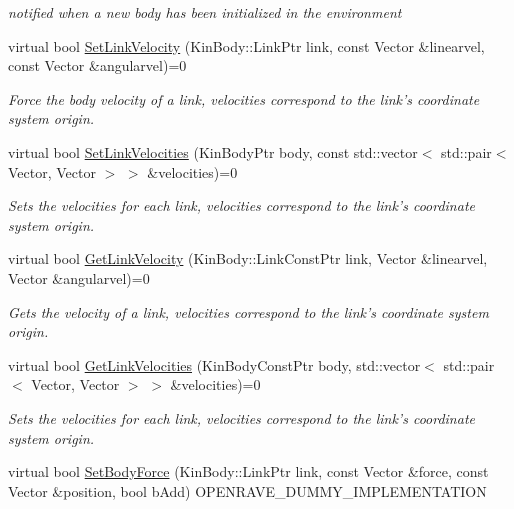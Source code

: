 \begin{DoxyCompactItemize}
\begin{DoxyCompactList}\small\item\em notified when a new body has been initialized in the environment \item\end{DoxyCompactList}\item 
virtual bool \hyperlink{classOpenRAVE_1_1PhysicsEngineBase_a22f75fdf00f98694da099efeb13bff41}{SetLinkVelocity} (KinBody::LinkPtr link, const Vector \&linearvel, const Vector \&angularvel)=0
\begin{DoxyCompactList}\small\item\em Force the body velocity of a link, velocities correspond to the link's coordinate system origin. \item\end{DoxyCompactList}\item 
virtual bool \hyperlink{classOpenRAVE_1_1PhysicsEngineBase_af03adc7bf75eb75c954ae0396df1f193}{SetLinkVelocities} (KinBodyPtr body, const std::vector$<$ std::pair$<$ Vector, Vector $>$ $>$ \&velocities)=0
\begin{DoxyCompactList}\small\item\em Sets the velocities for each link, velocities correspond to the link's coordinate system origin. \item\end{DoxyCompactList}\item 
virtual bool \hyperlink{classOpenRAVE_1_1PhysicsEngineBase_a696a55b63521ab0e08b9b203d2b3bcdb}{GetLinkVelocity} (KinBody::LinkConstPtr link, Vector \&linearvel, Vector \&angularvel)=0
\begin{DoxyCompactList}\small\item\em Gets the velocity of a link, velocities correspond to the link's coordinate system origin. \item\end{DoxyCompactList}\item 
virtual bool \hyperlink{classOpenRAVE_1_1PhysicsEngineBase_a4ab5cdca35ec2cc52158345188d370e2}{GetLinkVelocities} (KinBodyConstPtr body, std::vector$<$ std::pair$<$ Vector, Vector $>$ $>$ \&velocities)=0
\begin{DoxyCompactList}\small\item\em Sets the velocities for each link, velocities correspond to the link's coordinate system origin. \item\end{DoxyCompactList}\item 
virtual bool \hyperlink{classOpenRAVE_1_1PhysicsEngineBase_aac5b2aa6d0506ac155b01c4a981970e6}{SetBodyForce} (KinBody::LinkPtr link, const Vector \&force, const Vector \&position, bool bAdd) OPENRAVE\_\-DUMMY\_\-IMPLEMENTATION

\end{DoxyCompactItemize}
